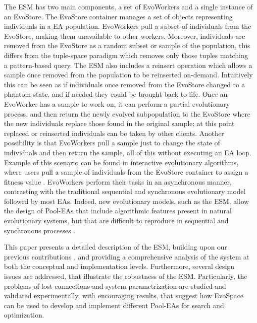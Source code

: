 The ESM has two main components, a set of EvoWorkers and a single instance of an EvoStore. The EvoStore container manages a set of objects representing individuals in a EA population. EvoWorkers pull a subset of individuals from the EvoStore, making them unavailable to other workers. Moreover, individuals are removed from the EvoStore as a random subset or sample of the population, this differs from the tuple-space paradigm which removes only those tuples matching a pattern-based query. The ESM also includes a reinsert operation which allows a sample once removed from the population to be reinserted on-demand. Intuitively this can be seen as if individuals once removed from the EvoStore changed to a phantom state, and if needed they could be brought back to life. Once an EvoWorker has a sample to work on, it can perform a partial evolutionary process, and then return the newly evolved subpopulation to the EvoStore where the new individuals replace those found in the original sample; at this point replaced or reinserted individuals can be taken by other clients. Another possibility is that  EvoWorkers pull a sample just to change the state of individuals and then return the sample, all of this without executing an EA loop. Example of this scenario can be found in interactive evolutionary algorithms, where users pull a sample of individuals from the EvoStore container to assign a fitness value \cite{Musart,Fire}.  
EvoWorkers perform their tasks in an asynchronous manner, contrasting with the traditional sequential and synchronous evolutionary model followed by most EAs. Indeed, new evolutionary models, such as the ESM, allow the design of Pool-EAs that include algorithmic features present in natural evolutionary systems, but that are difficult to reproduce in sequential and synchronous processes \cite{eiben}.

This paper presents a detailed description of the ESM, building upon our previous contributions \cite{Evospace,FreeLunch},
and providing a comprehensive analysis of the system at both the
conceptual and implementation levels.
Furthermore, several design issues are addressed, that illustrate the robustness of the ESM.
Particularly, the problems of lost connections and system parametrization are studied and validated experimentally, with
encouraging results, that suggest how EvoSpace can be used to develop and implement different Pool-EAs for search and optimization.

%
%

